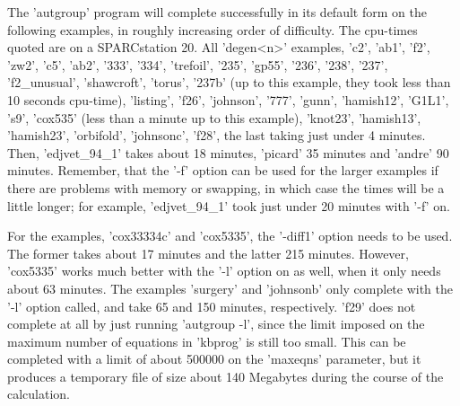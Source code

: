 The 'autgroup' program will complete successfully in its default form on the
following examples, in roughly increasing order of difficulty.
The cpu-times quoted are on a SPARCstation 20.
All 'degen<n>' examples, 'c2', 'ab1', 'f2', 'zw2', 'c5', 'ab2', '333',
'334', 'trefoil', '235', 'gp55', '236', '238', '237', 'f2\_unusual',
'shawcroft', 'torus', '237b' (up to this example, they took less than
10 seconds cpu-time), 'listing', 'f26',
'johnson', '777', 'gunn', 'hamish12', 'G1L1', 's9', 'cox535' (less than
a minute up to this example), 'knot23', 'hamish13', 'hamish23',
'orbifold', 'johnsonc', 'f28', the last taking just under 4 minutes. 
Then, 'edjvet\_94\_1' takes about 18 minutes, 'picard' 35 minutes and 'andre'
90 minutes.  Remember, that the '-f' option can be used for the larger
examples if there are problems with memory or swapping, in which case
the times will be a little longer; for example, 'edjvet\_94\_1' took just under
20 minutes with '-f' on.

For the examples, 'cox33334c' and 'cox5335', the '-diff1' option needs
to be used. The former takes about 17 minutes and the latter 215 minutes.
However, 'cox5335' works much better with the '-l' option on as well, when
it only needs about 63 minutes. The examples 'surgery' and 'johnsonb'
only complete with the '-l' option called, and take 65 and 150 minutes,
respectively. 'f29' does not complete at all by just running 'autgroup -l',
since the limit imposed on the maximum number of equations in 'kbprog' is
still too small. This can be completed with a limit of about 500000 on
the 'maxeqns' parameter, but it produces a temporary file of size about 140
Megabytes during the course of the calculation.

